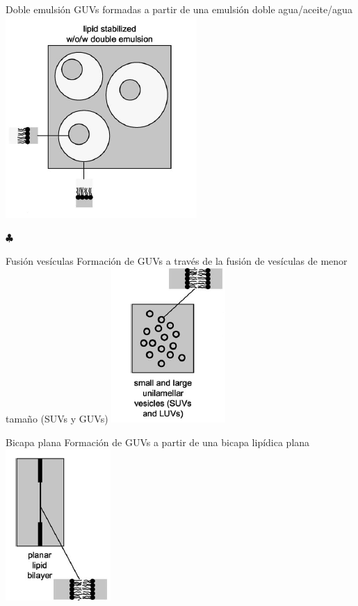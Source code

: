 \documentclass[spanish]{beamer}
\begin{document}
\begin{frame}{Doble emulsión}
  GUVs formadas a partir de una emulsión doble agua/aceite/agua\\
  \centering
  \vfill
  \centering
  \includegraphics[scale=0.6]{img/m_doubleemulsion}
  \vfill \small \slshape \raggedright $\clubsuit$

\end{frame}

\begin{frame}{Fusión vesículas}
  Formación de GUVs a través de la fusión de vesículas de menor tamaño (SUVs y GUVs)
  \vfill
  \centering
  \includegraphics[scale=0.6]{img/m_suv}
\end{frame}

\begin{frame}{Bicapa plana}
  Formación de GUVs a partir de una bicapa lipídica plana
  \vfill
  \centering
  \includegraphics[scale=0.6]{img/m_planar}
\end{frame}
\end{document}
